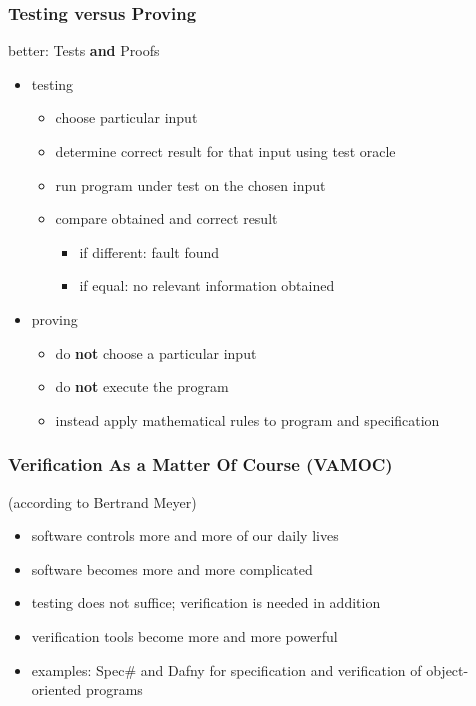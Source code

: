 \begin{multicols}{2}
\subsubsection{Testing versus Proving}
better: Tests \textbf{and} Proofs
\begin{itemize}
  \item testing
  \begin{itemize}
    \item choose particular input
    \item determine correct result for that input using test oracle
    \item run program under test on the chosen input
    \item compare obtained and correct result
    \begin{itemize}
      \item if different: fault found
      \item if equal: no relevant information obtained
    \end{itemize}
  \end{itemize}
  \item proving
  \begin{itemize}
    \item do \textbf{not} choose a particular input
    \item do \textbf{not} execute the program
    \item instead apply mathematical rules to program and specification
  \end{itemize}
\end{itemize}

\subsubsection{Verification As a Matter Of Course (VAMOC)}
(according to Bertrand Meyer)
\begin{itemize}
  \item software controls more and more of our daily lives
  \item software becomes more and more complicated
  \item testing does not suffice; verification is needed in addition
  \item verification tools become more and more powerful
  \item examples: Spec\# and Dafny for specification and verification of object-oriented programs
\end{itemize}


\end{multicols}
